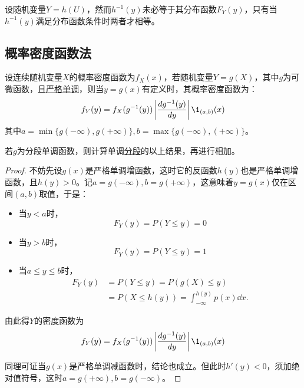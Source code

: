 \begin{remark}
    设随机变量$Y=h(U)$，然而$h^{-1}(y)$未必等于其分布函数$F_Y(y)$，只有当$h^{-1}(y)$满足分布函数条件时两者才相等。
\end{remark}


\subsection{概率密度函数法}

\begin{theorem}[单变量函数的概率函数变换]
    设连续随机变量$X$的概率密度函数为$f_X(x)$，若随机变量$Y=g(X)$，其中$g$为可微函数，且\underline{严格单调}，则当$y=g(x)$有定义时，其概率密度函数为：
    \[ f_Y(y)=f_X(g^{-1}(y))\left| \frac{dg^{-1}(y)}{dy} \right| \1_{(a,b)}(x) \]
    其中$a=\min\{g(-\infty),g(+\infty)\},b=\max\{g(-\infty),(+\infty)\}$。

    若$g$为分段单调函数，则计算单调\underline{分段}的以上结果，再进行相加。
\end{theorem}
\begin{proof}
    不妨先设$g(x)$是严格单调增函数，这时它的反函数$h(y)$也是严格单调增函数，且$h(y)>0$。记$a=g(-\infty),b=g(+\infty)$，这意味着$y=g(x)$仅在区间$(a,b)$取值，于是：
    \begin{itemize}
        \item 当$y<a$时，
              \[ F_Y(y) = P(Y\le y) = 0 \]
        \item 当$y>b$时，
              \[ F_Y(y) = P(Y\le y) = 1 \]
        \item 当$a\le y\le b$时，
              \begin{align*}
                  F_Y(y) & = P(Y \le y) = P( g(X) \le y )                      \\
                         & = P(X \le h(y)) = \int_{-\infty}^{h(y)} p(x) \dd x.
              \end{align*}
    \end{itemize}
    由此得$Y$的密度函数为
    \[ f_Y(y)=f_X(g^{-1}(y))\left| \frac{dg^{-1}(y)}{dy} \right| \1_{(a,b)}(x) \]

    同理可证当$g(x)$是严格单调减函数时，结论也成立。但此时$h'(y)<0$，须加绝对值符号，这时$a=g(+\infty),b=g(-\infty)$。
\end{proof}

